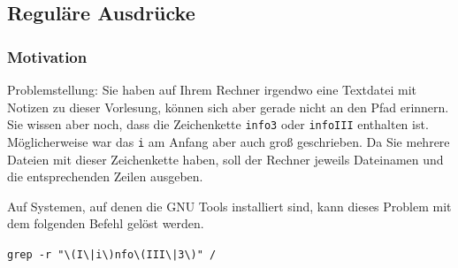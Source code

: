%

\renewcommand{\llbracket}{[\![}
\renewcommand{\rrbracket}{]\!]}

\subsection{Reguläre Ausdrücke}
\subsubsection{Motivation}
Problemstellung: Sie haben auf Ihrem Rechner irgendwo eine Textdatei mit Notizen zu dieser Vorlesung, können sich aber gerade nicht an den Pfad erinnern.
Sie wissen aber noch, dass die Zeichenkette \texttt{info3} oder \texttt{infoIII} enthalten ist. 
Möglicherweise war das \texttt{i} am Anfang aber auch groß geschrieben.
Da Sie mehrere Dateien mit dieser Zeichenkette haben, soll der Rechner jeweils Dateinamen und die entsprechenden Zeilen ausgeben.

Auf Systemen, auf denen die GNU Tools installiert sind, kann dieses Problem mit dem folgenden Befehl gelöst werden.
\begin{center}
\verb+grep -r "\(I\|i\)nfo\(III\|3\)" /+ 
\end{center}



